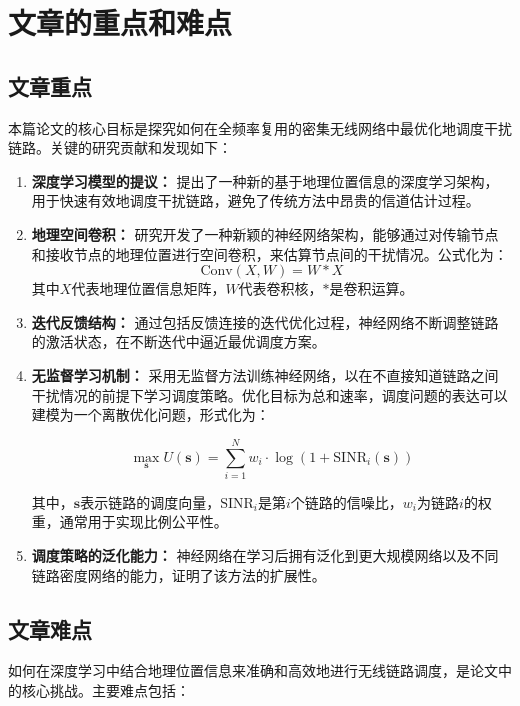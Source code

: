 \documentclass[UTF8, 12pt]{article}
\numberwithin{figure}{section}
\begin{document}
\section{文章的重点和难点}
\subsection{文章重点}

本篇论文的核心目标是探究如何在全频率复用的密集无线网络中最优化地调度干扰链路。关键的研究贡献和发现如下：

\begin{enumerate}
  \item \textbf{深度学习模型的提议：} 提出了一种新的基于地理位置信息的深度学习架构，用于快速有效地调度干扰链路，避免了传统方法中昂贵的信道估计过程。
   
  \item \textbf{地理空间卷积：} 研究开发了一种新颖的神经网络架构，能够通过对传输节点和接收节点的地理位置进行空间卷积，来估算节点间的干扰情况。公式化为：
   \[
   \text{Conv}(X, W) = W * X
   \]
   其中\(X\)代表地理位置信息矩阵，\(W\)代表卷积核，\(*\)是卷积运算。

  \item \textbf{迭代反馈结构：} 通过包括反馈连接的迭代优化过程，神经网络不断调整链路的激活状态，在不断迭代中逼近最优调度方案。

  \item \textbf{无监督学习机制：} 采用无监督方法训练神经网络，以在不直接知道链路之间干扰情况的前提下学习调度策略。优化目标为总和速率，调度问题的表达可以建模为一个离散优化问题，形式化为：
 
  \[\max_{\mathbf{s}} U(\mathbf{s}) = \sum_{i=1}^{N} w_i \cdot \log(1+\text{SINR}_i(\mathbf{s}))\]
  
  其中，\( \mathbf{s} \)表示链路的调度向量，\( \text{SINR}_i \)是第\( i \)个链路的信噪比，\( w_i \)为链路\( i \)的权重，通常用于实现比例公平性。

  \item \textbf{调度策略的泛化能力：} 神经网络在学习后拥有泛化到更大规模网络以及不同链路密度网络的能力，证明了该方法的扩展性。
\end{enumerate}

\subsection{文章难点}

如何在深度学习中结合地理位置信息来准确和高效地进行无线链路调度，是论文中的核心挑战。主要难点包括：
\end{document}
